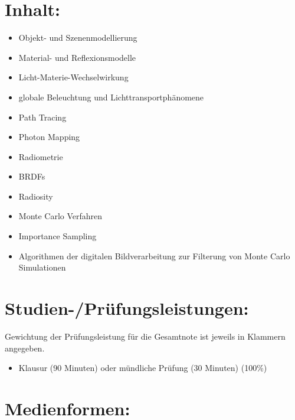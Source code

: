 \section*{Inhalt:\label{/mi-2017/modulbeschreibungen-master/MA_VC_Modul_PhotorealistischeBildsynthese}}\label{inhaltpathlabelmi-2017modulbeschreibungen-mastermaux5fvcux5fmodulux5fphotorealistischebildsynthese}

\begin{itemize}
\tightlist
\item
  Objekt- und Szenenmodellierung
\item
  Material- und Reflexionsmodelle
\item
  Licht-Materie-Wechselwirkung
\item
  globale Beleuchtung und Lichttransportphänomene
\item
  Path Tracing
\item
  Photon Mapping
\item
  Radiometrie
\item
  BRDFs
\item
  Radiosity
\item
  Monte Carlo Verfahren
\item
  Importance Sampling
\item
  Algorithmen der digitalen Bildverarbeitung zur Filterung von Monte
  Carlo Simulationen
\end{itemize}

\section*{Studien-/Prüfungsleistungen:\label{/mi-2017/modulbeschreibungen-master/MA_VC_Modul_PhotorealistischeBildsynthese}}\label{studien-pruxfcfungsleistungenpathlabelmi-2017modulbeschreibungen-mastermaux5fvcux5fmodulux5fphotorealistischebildsynthese}

Gewichtung der Prüfungsleistung für die Gesamtnote ist jeweils in
Klammern angegeben.

\begin{itemize}
\tightlist
\item
  Klausur (90 Minuten) oder mündliche Prüfung (30 Minuten) (100\%)
\end{itemize}

\section*{Medienformen:\label{/mi-2017/modulbeschreibungen-master/MA_VC_Modul_PhotorealistischeBildsynthese}}\label{medienformenpathlabelmi-2017modulbeschreibungen-mastermaux5fvcux5fmodulux5fphotorealistischebildsynthese}

